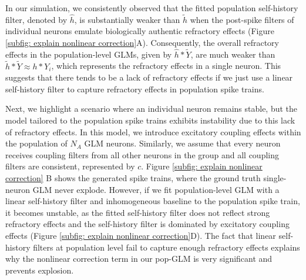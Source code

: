 \documentclass[12pt]{article}
\begin{document}
In our simulation, we consistently observed that the fitted population self-history filter, denoted by $\hat{h}$, is substantially weaker than $\tilde{h}$ when the post-spike filters of individual neurons emulate biologically authentic refractory effects (Figure \ref{subfig: explain nonlinear correction}A). Consequently, the overall refractory effects in the population-level GLMs, given by $\hat{h}*\tilde{Y}$, are much weaker than $\tilde{h}*\tilde{Y} \approx h*Y_i$, which represents the refractory effects in a single neuron. This suggests that there tends to be a lack of refractory effects if we just use a linear self-history filter to capture refractory effects in population spike trains. 

Next, we highlight a scenario where an individual neuron remains stable, but the model tailored to the population spike trains exhibits instability due to this lack of refractory effects. In this model, we introduce excitatory coupling effects within the population of $N_A$ GLM neurons. Similarly, we assume that every neuron receives coupling filters from all other neurons in the group and all coupling filters are consistent, represented by $c$. Figure \ref{subfig: explain nonlinear correction} B shows the generated spike trains, where the ground truth single-neuron GLM never explode. However, if we fit population-level GLM with a linear self-history filter and inhomogeneous baseline to the population spike train, it becomes unstable, as the fitted self-history filter does not reflect strong refractory effects and the self-history filter is dominated by excitatory coupling effects (Figure \ref{subfig: explain nonlinear correction}D). The fact that linear self-history filters at population level fail to capture enough refractory effects explains why the nonlinear correction term in our pop-GLM is very significant and prevents explosion. 
\end{document}
